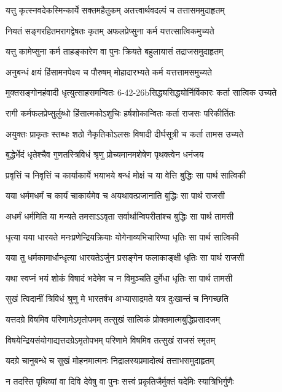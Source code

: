 \twolineshloka
{यत्तु कृत्स्नवदेकस्मिन्कार्ये सक्तमहैतुकम्}
{अतत्त्वार्थवदल्पं च तत्तासममुदाहृतम्}


\twolineshloka
{नियतं सङ्गरहितमरागद्वेषतः कृतम्}
{अफलप्रेप्सुना कर्म यत्तत्सात्विकमुच्यते}


\twolineshloka
{यत्तु कामेप्सुना कर्म ताहङ्कारेण वा पुनः}
{क्रियते बहुलायासं तद्राजसमुदाहृतम्}


\twolineshloka
{अनुबन्धं क्षयं हिंसामनपेक्ष्य च पौरुषम्}
{मोहादारभ्यते कर्म यत्तत्तामसमुच्यते}


\twolineshloka
{मुक्तसङ्गोनहंवादी धृत्युत्साहसमन्वितः}
{6-42-26bसिद्ध्यसिद्ध्योर्निर्विकारः कर्ता सात्विक उच्यते}


\twolineshloka
{रागी कर्मफलप्रेप्सुर्लुब्धो हिंसात्मकोऽशुचिः}
{हर्षशोकान्वितः कर्ता राजसः परिकीर्तितः}


\twolineshloka
{अयुक्तः प्राकृतः स्तब्धः शठो नैकृतिकोऽलसः}
{विषादी दीर्घसूत्री च कर्ता तामस उच्यते}


\twolineshloka
{बुद्धेर्भेदं धृतेश्चैव गुणतस्त्रिविधं श्रृणु}
{प्रोच्यमानमशेषेण पृथक्त्वेन धनंजय}


\twolineshloka
{प्रवृत्तिं च निवृत्तिं च कार्याकार्ये भयाभये}
{बन्धं मोक्षं च या वेत्ति बुद्धिः सा पार्थ सात्विकी}


\twolineshloka
{यया धर्ममधर्मं च कार्यं चाकार्यमेव च}
{अयथावत्प्रजानाति बुद्धिः सा पार्थ राजसी}


\twolineshloka
{अधर्मं धर्ममिति या मन्यते तमसाऽऽवृता}
{सर्वार्थान्विपरीतांश्च बुद्धिः सा पार्थ तामसी}


\twolineshloka
{धृत्या यया धारयते मनःप्रणेन्द्रियक्रियाः}
{योगेनाव्यभिचारिण्या धृतिः सा पार्थ सात्विकी}


\twolineshloka
{यया तु धर्मकामार्धान्धृत्या धारयतेऽर्जुन}
{प्रसङ्गेन फलाकाङ्क्षी धृतिः सा पार्थ राजसी}


\twolineshloka
{यथा स्वप्नं भयं शोकं विषादं भदेमेव च}
{न विमुञ्चति दुर्मेधा धृतिः सा पार्थ तामसी}


\twolineshloka
{सुखं त्विदानीं त्रिविधं श्रुणु मे भारतर्षभ}
{अभ्यासाद्रमते यत्र दुःखान्तं च निगच्छति}


\twolineshloka
{यत्तदग्रे विषमिव परिणामेऽमृतोपमम्}
{तत्सुखं सात्विकं प्रोक्तमात्मबुद्धिप्रसादजम्}


\twolineshloka
{विषयेन्द्रियसंयोगाद्यत्तदग्रेऽमृतोपभम्}
{परिणामे विषमिव तत्सुखं राजसं स्मृतम्}


\twolineshloka
{यदग्रे चानुबन्धे च सुखं मोहनमात्मनः}
{निद्रालस्यप्रमादोत्थं तत्ताभसमुदाहृतम्}


\twolineshloka
{न तदस्ति पृथिव्यां वा दिवि देवेषु वा पुनः}
{सत्त्वं प्रकृतिजैर्मुक्तं यदेमिः स्यात्रिभिर्गुणैः}


